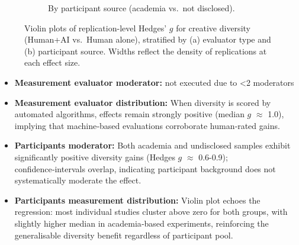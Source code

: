 \documentclass[manuscript, screen, review, acmsmall, anonymous]{acmart}
\begin{document}
\begin{figure}[H]
\begin{subfigure}[t]{0.49\linewidth}
    \caption{By participant source (academia vs.\ not disclosed).}
    \label{fig:diversity_raw_violin_participants}
  \end{subfigure}
  \caption{Violin plots of replication-level Hedges’ $g$ for creative diversity (Human+AI vs.\ Human alone), stratified by (a) evaluator type and (b) participant source. Widths reflect the density of replications at each effect size.}
  \label{fig:diversity_raw_violins_eval_part}
\end{figure}
\begin{itemize}
  \item \textbf{Measurement evaluator moderator:} not executed due to <2 moderators
  \item \textbf{Measurement evaluator distribution:} When diversity is scored by automated algorithms, effects remain strongly positive (median $g$ $\approx$ 1.0), implying that machine‑based evaluations corroborate human‑rated gains. 
  \item \textbf{Participants moderator:} Both academia and undisclosed samples exhibit significantly positive diversity gains (Hedges $g$ $\approx$ 0.6-0.9); confidence‑intervals overlap, indicating participant background does not systematically moderate the effect.
  \item \textbf{Participants measurement distribution:} Violin plot echoes the regression: most individual studies cluster above zero for both groups, with slightly higher median in academia‑based experiments, reinforcing the generalisable diversity benefit regardless of participant pool.
\end{itemize}
\end{document}
